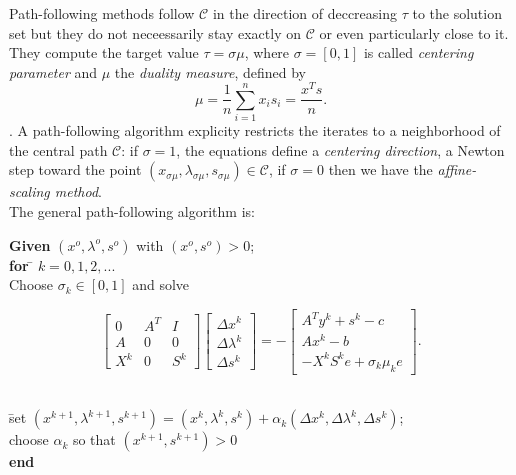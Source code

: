 \documentclass[a4paper,10 pt,titlepage,twoside]{book}
\theoremstyle{plain}
\theoremstyle{definition}
\theoremstyle{remark}
\begin{document}
 Path-following methods follow $\mathcal{C}$ in the direction of deccreasing $\tau$ to the solution set but they do not neceessarily stay exactly on $\mathcal{C}$ or even particularly close to it. They compute the target value $\tau = \sigma \mu$, where $\sigma = [0,1]$ is called \textit{centering parameter} and $\mu$ the \textit{duality measure}, defined by
  \begin{equation*}
 \mu = \frac{1}{n}\sum_{i=1}^{n} x_{i}s_{i} = \frac{x^{T}s}{n}.
 \end{equation*}.
 A path-following algorithm explicity restricts the iterates to a neighborhood of the central path $\mathcal{C}$: if $\sigma = 1$, the equations define a \textit{centering direction}, a Newton step toward the point $(x_{\sigma\mu},\lambda_{\sigma\mu}, s_{\sigma\mu})\in\mathcal{C}$, if $\sigma = 0$ then we have the \textit{affine-scaling method}.\\  
The general path-following algorithm is:
\begin{tabbing}
\textbf{Given} $(x^{o}, \lambda^{o}, s^{o})$ with $(x^{o}, s^{o})>0$;\\
\textbf{for} \= $k = 0, 1, 2,...$ \\
\> Choose $\sigma_{k}\in[0,1]$ and solve
\end{tabbing}
\begin{equation}\label{P}
	\begin{bmatrix}\label{P}
	0&A^{T}&I \\A&0&0\\X^{k}&0&S^{k}
	\end{bmatrix}\begin{bmatrix}
	\Delta x^{k}\\\Delta\lambda^{k} \\\Delta s^{k}
	\end{bmatrix}=-\begin{bmatrix}
	A^{T}y^{k}+s^{k}-c\\Ax^{k}-b\\-X^{k}S^{k}e + \sigma_{k}\mu_{k}e
	\end{bmatrix}.
\end{equation}
\begin{tabbing}
	\\
	\=set $(x^{k+1}, \lambda^{k+1}, s^{k+1}) = (x^{k}, \lambda^{k}, s^{k})+ \alpha_{k}(\Delta x^{k}, \Delta\lambda^{k}, \Delta s^{k})$;\\
	\> choose $\alpha_{k}$ so that $(x^{k+1}, s^{k+1})>0$ \\
	\textbf{end}
\end{tabbing}
\end{document}
